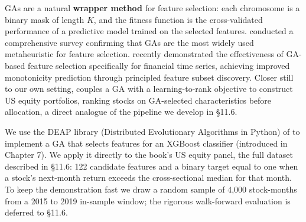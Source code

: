 GAs are a natural \textbf{wrapper method} for feature selection: each chromosome is a binary mask of length $K$, and the fitness function is the cross-validated performance of a predictive model trained on the selected features. \cite{Dokeroglu2022} conducted a comprehensive survey confirming that GAs are the most widely used metaheuristic for feature selection. \cite{deBarros2024} recently demonstrated the effectiveness of GA-based feature selection specifically for financial time series, achieving improved monotonicity prediction through principled feature subset discovery. Closer still to our own setting, \cite{Kottas2026} couples a GA with a learning-to-rank objective to construct US equity portfolios, ranking stocks on GA-selected characteristics before allocation, a direct analogue of the pipeline we develop in §11.6.

We use the DEAP library (Distributed Evolutionary Algorithms in Python) of \cite{Fortin2012} to implement a GA that selects features for an XGBoost classifier (introduced in Chapter 7). We apply it directly to the book's US equity panel, the full dataset described in §11.6: 122 candidate features and a binary target equal to one when a stock's next-month return exceeds the cross-sectional median for that month. To keep the demonstration fast we draw a random sample of 4,000 stock-months from a 2015 to 2019 in-sample window; the rigorous walk-forward evaluation is deferred to §11.6.


